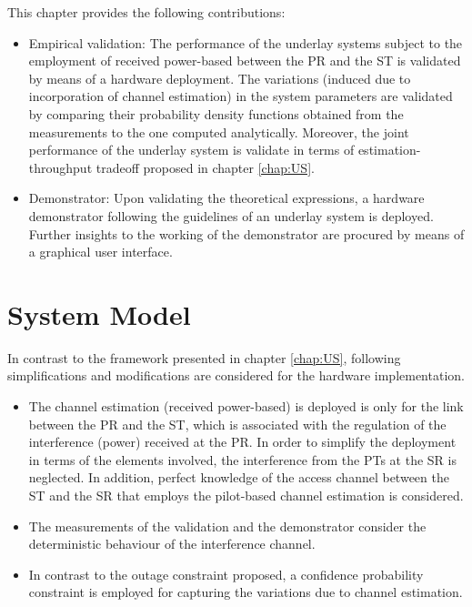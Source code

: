 This chapter provides the following contributions:
\begin{itemize}
	\item Empirical validation: The performance of the underlay systems subject to the employment of received power-based between the PR and the ST is validated by means of a hardware deployment. The variations (induced due to incorporation of channel estimation) in the system parameters are validated by comparing their probability density functions obtained from the measurements to the one computed analytically. Moreover, the joint performance of the underlay system is validate in terms of estimation-throughput tradeoff proposed in chapter \ref{chap:US}. %
	\item Demonstrator: Upon validating the theoretical expressions, a hardware demonstrator following the guidelines of an underlay system is deployed. Further insights to the working of the demonstrator are procured by means of a graphical user interface.	
\end{itemize}



\section{System Model}
\label{sysmod}
In contrast to the framework presented in chapter \ref{chap:US}, following simplifications and modifications are considered for the hardware implementation.
\begin{itemize}
\item The channel estimation (received power-based) is deployed is only for the link between the PR and the ST, which is associated with the regulation of the interference (power) received at the PR. In order to simplify the deployment in terms of the elements involved, the interference from the PTs at the SR is neglected. In addition, perfect knowledge of the access channel between the ST and the SR that employs the pilot-based channel estimation is considered. 
\item The measurements of the validation and the demonstrator consider the deterministic behaviour of the interference channel.  
\item In contrast to the outage constraint proposed, a confidence probability constraint is employed for capturing the variations due to channel estimation. %
\end{itemize}

